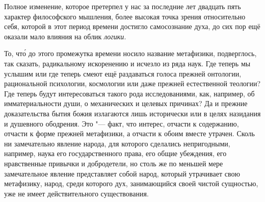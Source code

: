 Полное изменение, которое претерпел у нас за последние лет двадцать пять
характер философского мышления, более высокая точка зрения относительно себя,
которой в этот период времени достигло самосознание духа, до сих пор ещё
оказали мало влияния на облик {\em логики}.

То, чт\'{о} до этого промежутка времени носило название метафизики,
подверглось, так сказать, радикальному искоренению и исчезло из ряда наук. Где
теперь мы услышим или где теперь смеют ещё раздаваться голоса прежней
онтологии, рациональной психологии, космологии или даже прежней естественной
теологии? Где теперь будут интересоваться такого рода исследованиями, как,
например, об имматериальности души, о механических и целевых причинах? Да и
прежние доказательства бытия божия излагаются лишь исторически или в целях
назидания и душевного ободрения. Это "--- факт, что интерес, отчасти к
содержанию, отчасти к форме прежней метафизики, а отчасти к обоим вместе
утрачен. Сколь ни замечательно явление народа, для которого сделались
непригодными, например, наука его государственного права, его общие убеждения,
его нравственные привычки и добродетели, но столь же по меньшей мере
замечательное явление представляет собой народ, который утрачивает свою
метафизику, народ, среди которого дух, занимающийся своей чистой сущностью,
уже не имеет действительного существования.

